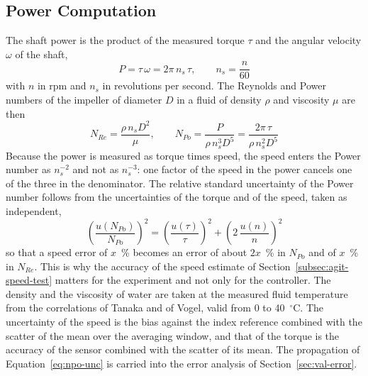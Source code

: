 \subsection{Power Computation}
\label{subsec:agit-power}

The shaft power is the product of the measured torque $\tau$ and the angular velocity $\omega$ of the shaft,
\begin{equation}
    P = \tau\,\omega = 2\pi\, n_s\, \tau, \qquad n_s = \frac{n}{60}
    \label{eq:shaftpower}
\end{equation}
with $n$ in rpm and $n_s$ in revolutions per second. The Reynolds and Power numbers of the impeller of diameter $D$ in a fluid of density $\rho$ and viscosity $\mu$ are then
\begin{equation}
    N_{Re} = \frac{\rho\, n_s D^{2}}{\mu}, \qquad
    N_{Po} = \frac{P}{\rho\, n_s^{3} D^{5}} = \frac{2\pi\,\tau}{\rho\, n_s^{2} D^{5}}
    \label{eq:npo-torque}
\end{equation}
Because the power is measured as torque times speed, the speed enters the Power number as $n_s^{-2}$ and not as $n_s^{-3}$: one factor of the speed in the power cancels one of the three in the denominator. The relative standard uncertainty of the Power number follows from the uncertainties of the torque and of the speed, taken as independent,
\begin{equation}
    \left(\frac{u(N_{Po})}{N_{Po}}\right)^{2} = \left(\frac{u(\tau)}{\tau}\right)^{2} + \left(2\,\frac{u(n)}{n}\right)^{2}
    \label{eq:npo-unc}
\end{equation}
so that a speed error of $x$~\% becomes an error of about $2x$~\% in $N_{Po}$ and of $x$~\% in $N_{Re}$. This is why the accuracy of the speed estimate of Section~\ref{subsec:agit-speed-test} matters for the experiment and not only for the controller. The density and the viscosity of water are taken at the measured fluid temperature from the correlations of Tanaka and of Vogel, valid from 0 to 40~$^{\circ}$C. The uncertainty of the speed is the bias against the index reference combined with the scatter of the mean over the averaging window, and that of the torque is the accuracy of the sensor combined with the scatter of its mean. The propagation of Equation~\ref{eq:npo-unc} is carried into the error analysis of Section~\ref{sec:val-error}.



